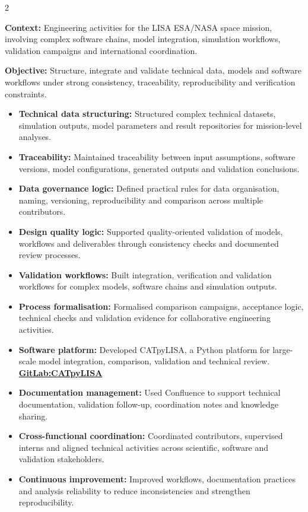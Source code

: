 \documentclass[8pt,a4paper,ragged2e,withhyper]{altacv}
\begin{document}
\begin{paracol}{2}
\divider


\textbf{Context:} Engineering activities for the LISA ESA/NASA space mission, involving complex software chains, model integration, simulation workflows, validation campaigns and international coordination.

\textbf{Objective:} Structure, integrate and validate technical data, models and software workflows under strong consistency, traceability, reproducibility and verification constraints.

\begin{itemize}
  \item \textbf{Technical data structuring:} Structured complex technical datasets, simulation outputs, model parameters and result repositories for mission-level analyses.
  \item \textbf{Traceability:} Maintained traceability between input assumptions, software versions, model configurations, generated outputs and validation conclusions.
  \item \textbf{Data governance logic:} Defined practical rules for data organisation, naming, versioning, reproducibility and comparison across multiple contributors.
  \item \textbf{Design quality logic:} Supported quality-oriented validation of models, workflows and deliverables through consistency checks and documented review processes.
  \item \textbf{Validation workflows:} Built integration, verification and validation workflows for complex models, software chains and simulation outputs.
  \item \textbf{Process formalisation:} Formalised comparison campaigns, acceptance logic, technical checks and validation evidence for collaborative engineering activities.
  \item \textbf{Software platform:} Developed CATpyLISA, a Python platform for large-scale model integration, comparison, validation and technical review.
  \textcolor{DarkPastelRed}{\href{https://gitlab.oca.eu/gboileau/lisa_l3_tools}{\bf GitLab:CATpyLISA}}
  \item \textbf{Documentation management:} Used Confluence to support technical documentation, validation follow-up, coordination notes and knowledge sharing.
  \item \textbf{Cross-functional coordination:} Coordinated contributors, supervised interns and aligned technical activities across scientific, software and validation stakeholders.
  \item \textbf{Continuous improvement:} Improved workflows, documentation practices and analysis reliability to reduce inconsistencies and strengthen reproducibility.
\end{itemize}


\end{paracol}
\end{document}
